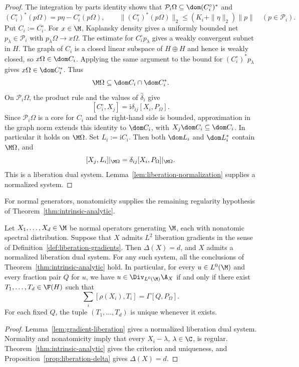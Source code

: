\begin{proof}
The integration by parts identity shows that $\mathcal P_i\Omega\subseteq\dom(C_i^\circ)^*$ and
\[
 (C_i^\circ)^*(p\Omega)=p\eta-C_i^\circ(p\Omega),\qquad
 \|(C_i^\circ)^*(p\Omega)\|_2\leq(K_i+\|\eta\|_2)\|p\|
 \quad(p\in\mathcal P_i).
\]
Put $C_i:=\overline{C_i^\circ}$.
For $x\in\M$, Kaplansky density \cite[Theorem~2.3.1]{AP18} gives a uniformly bounded net $p_\lambda\in\mathcal P_i$ with $p_\lambda\Omega\to x\Omega$.
The estimate for $C_i^\circ p_\lambda$ gives a weakly convergent subnet in $H$.
The graph of $C_i$ is a closed linear subspace of $H\oplus H$ and hence is weakly closed, so $x\Omega\in\dom C_i$.
Applying the same argument to the bound for $(C_i^\circ)^*p_\lambda$ gives $x\Omega\in\dom C_i^*$.
Thus
\[
 \M\Omega\subseteq\dom C_i\cap\dom C_i^*.
\]
On $\mathcal P_i\Omega$, the product rule and the values of $\widehat\delta_i$ give
\[
 [C_i^\circ,X_j]=\mathrm i\delta_{ij}[X_i,P_\Omega].
\]
Since $\mathcal P_i\Omega$ is a core for $C_i$ and the right-hand side is bounded, approximation in the graph norm extends this identity to $\dom C_i$, with $X_j\dom C_i\subseteq\dom C_i$.
In particular it holds on $\M\Omega$.
Set $L_i:=\mathrm iC_i$.
Then both $\dom L_i$ and $\dom L_i^*$ contain $\M\Omega$, and
\[
 [X_j,L_i]|_{\M\Omega}=\delta_{ij}[X_i,P_\Omega]|_{\M\Omega}.
\]
This is a liberation dual system.
Lemma~\ref{lem:liberation-normalization} supplies a normalized system.
\end{proof}

For normal generators, nonatomicity supplies the remaining regularity hypothesis of Theorem~\ref{thm:intrinsic-analytic}.
\begin{proposition}\label{prop:liberation-gradients}
Let $X_1,\ldots,X_d\in\M$ be normal operators generating $\M$, each with nonatomic spectral distribution.
Suppose that $X$ admits $L^2$ liberation gradients in the sense of Definition~\ref{def:liberation-gradients}.
Then $\Delta(X)=d$, and $X$ admits a normalized liberation dual system.
For any such system, all the conclusions of Theorem~\ref{thm:intrinsic-analytic} hold.
In particular, for every $u\in L^0(\M)$ and every fraction pair $Q$ for $u$, we have $u\in\Div_{L^0(\M)}\A_X$ if and only if there exist $T_1,\ldots,T_d\in\F(H)$ such that
\[
 \sum_i[\rho(X_i),T_i]=\Gamma[Q,P_\Omega].
\]
For each fixed $Q$, the tuple $(T_1,\ldots,T_d)$ is unique whenever it exists.
\end{proposition}
\begin{proof}
Lemma~\ref{lem:gradient-liberation} gives a normalized liberation dual system.
Normality and nonatomicity imply that every $X_i-\lambda$, $\lambda\in\C$, is regular.
Theorem~\ref{thm:intrinsic-analytic} gives the criterion and uniqueness, and Proposition~\ref{prop:liberation-delta} gives $\Delta(X)=d$.
\end{proof}

